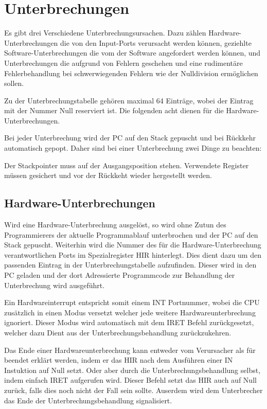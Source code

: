 \section{Unterbrechungen}
\label{sec:Unterbrechungen}

Es gibt drei Verschiedene Unterbrechungsursachen. Dazu zählen Hardware-Unterbrechungen die von
den Input-Ports verursacht werden können, geziehlte Software-Unterbrechungen die vom der 
Software angefordert werden können, und Unterbrechungen die aufgrund von Fehlern geschehen und
eine rudimentäre Fehlerbehandlung bei schwerwiegenden Fehlern wie der Nulldivision ermöglichen sollen.

Zu der Unterbrechungstabelle gehören maximal 64 Einträge, wobei der Eintrag mit der Nummer Null
reserviert ist. Die folgenden acht dienen für die Hardware-Unterbrechungen.

Bei jeder Unterbrechung wird der PC auf den Stack gepuscht und bei Rückkehr automatisch gepopt.
Daher sind bei einer Unterbrechung zwei Dinge zu beachten:

Der Stackpointer muss auf der Ausgangsposition stehen.
Verwendete Register müssen gesichert und vor der Rückkeht wieder hergestellt werden.

\subsection{Hardware-Unterbrechungen}

Wird eine Hardware-Unterbrechung ausgelöst, so wird ohne Zutun des Programmierers
der aktuelle Programmablauf unterbrochen und der PC auf den Stack gepuscht.
Weiterhin wird die Nummer des für die Hardware-Unterbrechung verantwortlichen Ports
im Spezialregister HIR hinterlegt. Dies dient dazu um den passenden Eintrag in der
Unterbrechungstabelle aufzufinden. Dieser wird in den PC geladen und der dort Adressierte
Programmcode zur Behandlung der Unterbrechung wird ausgeführt. 

Ein Hardwareinterrupt entspricht somit einem INT Portnummer, wobei die CPU 
zusätzlich in einen Modus versetzt welcher jede weitere Hardwareunterbrechung
ignoriert. Dieser Modus wird automatisch mit dem IRET Befehl zurückgesetzt,
welcher dazu Dient aus der Unterbrechungsbehandlung zurückzukehren.

Das Ende einer Hardwareunterbrechung kann entweder vom Verursacher als für beendet erklärt werden,
indem er das HIR nach dem Ausführen einer IN Instuktion auf Null setzt.
Oder aber durch die Unterbrechungsbehandlung selbst, indem einfach IRET aufgerufen wird.
Dieser Befehl setzt das HIR auch auf Null zurück, falls dies noch nicht der Fall sein sollte.
Auserdem wird dem Unterbrecher das Ende der Unterbrechungsbehandlung signalisiert.

